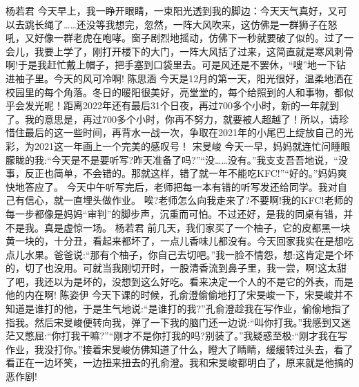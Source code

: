 {}\markdownRendererInterblockSeparator
{}杨若君\markdownRendererInterblockSeparator
{}今天早上，我一睁开眼睛，一束阳光透到我的脚边：今天天气真好，又可以去跳长绳了……还没等我想完，忽然，一阵大风吹来，这仿佛是一群狮子在怒吼，又好像一群老虎在咆哮。窗子剧烈地摇动，仿佛下一秒就要破了似的。过了一会儿，我要上学了，刚打开楼下的大门，一阵大风括了过来，这简直就是寒风刺骨啊!于是我赶忙戴上帽子，把手塞到口袋里去。可是风还是不罢休，“嗖”地一下钻进袖子里。今天的风可冷啊! \markdownRendererInterblockSeparator
{}\markdownRendererInterblockSeparator
{}陈思涵\markdownRendererInterblockSeparator
{}今天是12月的第一天，阳光很好，温柔地洒在校园里的每个角落。冬日的暖阳很美好，亮堂堂的，每个给照到的人和事物，都似乎会发光呢！距离2022年还有最后31个日夜，再过700多个小时，新的一年就到了。我的意思是，再过700多个小时，你再不努力，就要被人超越了！所以，请珍惜住最后的这一些时间，再背水一战一次，争取在2021年的小尾巴上绽放自己的光彩，为2021这一年画上一个完美的感叹号！\markdownRendererInterblockSeparator
{}\markdownRendererInterblockSeparator
{}宋旻峻\markdownRendererInterblockSeparator
{}今天一早，妈妈就连忙问睡眼朦眬的我:“今天是不是要听写?昨天准备了吗?”“没……没有。”我支支吾吾地说，“没事，反正也简单，不会错的。那就这样，错了就一年不能吃KFC!”“好的。”妈妈爽快地答应了。 \markdownRendererInterblockSeparator
{}今天中午听写完后，老师把每一本有错的听写发还给同学。我对自己有信心，就一直埋头做作业。 唉?老师怎么向我走来了?不要啊!我的KFC!老师的每一步都像是妈妈“审判”的脚步声，沉重而可怕。不过还好，是我的同桌有错，并不是我。真是虚惊一场。\markdownRendererInterblockSeparator
{}\markdownRendererInterblockSeparator
{}杨若君\markdownRendererInterblockSeparator
{}前几天，我们家买了一个柚子，它的皮都黑一块黄一块的，十分丑，看起来都坏了，一点儿香味儿都没有。今天回家我实在是想吃点儿水果。爸爸说:“那有个柚子，你自己去切吧。”我一脸不情怨，想:这肯定是个坏的，切了也没用。可就当我刚切开时，一股清香流到鼻子里，我一尝，啊!这太甜了吧，我还以为是坏的，没想到这么好吃。看来决定一个人的不是它的外表，而是他的内在啊!\markdownRendererInterblockSeparator
{}\markdownRendererInterblockSeparator
{}陈姿伊\markdownRendererInterblockSeparator
{}今天下课的时候，孔俞澄偷偷地打了宋旻峻一下，宋旻峻并不知道是谁打的他，于是生气地说:“是谁打的我?”孔俞澄趁我在写作业，偷偷地指了指我。然后宋旻峻便转向我，弹了一下我的脑门还一边说:“叫你打我。”我感到又迷茫又憋屈:“你打我干嘛?”“刚才不是你打我的吗?别装了。”我疑惑至极:“刚才我在写作业，我没打你。”接着宋旻峻仿佛知道了什么，瞪大了睛睛，缓缓转过头去，看了看正在一边坏笑，一边扭来扭去的孔俞澄。我和宋旻峻都明白了，原来就是他搞的恶作剧!\markdownRendererInterblockSeparator
